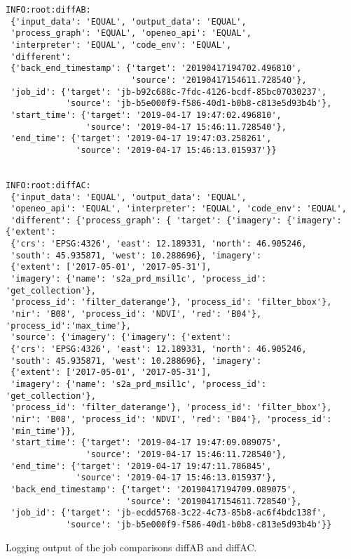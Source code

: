 \documentclass[draft,final]{vutinfth} %
\newenvironment{code}{\captionsetup{type=listing}}{}
\begin{document}
\begin{code}
	\begin{verbatim}
INFO:root:diffAB:
 {'input_data': 'EQUAL', 'output_data': 'EQUAL', 
 'process_graph': 'EQUAL', 'openeo_api': 'EQUAL', 
 'interpreter': 'EQUAL', 'code_env': 'EQUAL',
 'different': 
 {'back_end_timestamp': {'target': '20190417194702.496810',
                         'source': '20190417154611.728540'}, 
 'job_id': {'target': 'jb-b92c688c-7fdc-4126-bcdf-85bc07030237',
            'source': 'jb-b5e000f9-f586-40d1-b0b8-c813e5d93b4b'}, 
 'start_time': {'target': '2019-04-17 19:47:02.496810',
                'source': '2019-04-17 15:46:11.728540'}, 
 'end_time': {'target': '2019-04-17 19:47:03.258261',
              'source': '2019-04-17 15:46:13.015937'}} 


INFO:root:diffAC:
 {'input_data': 'EQUAL', 'output_data': 'EQUAL', 
 'openeo_api': 'EQUAL', 'interpreter': 'EQUAL', 'code_env': 'EQUAL',
 'different': {'process_graph': { 'target': {'imagery': {'imagery': {'extent': 
 {'crs': 'EPSG:4326', 'east': 12.189331, 'north': 46.905246, 
 'south': 45.935871, 'west': 10.288696}, 'imagery': 
 {'extent': ['2017-05-01', '2017-05-31'], 
 'imagery': {'name': 's2a_prd_msil1c', 'process_id': 'get_collection'}, 
 'process_id': 'filter_daterange'}, 'process_id': 'filter_bbox'}, 
 'nir': 'B08', 'process_id': 'NDVI', 'red': 'B04'}, 'process_id':'max_time'}, 
 'source': {'imagery': {'imagery': {'extent': 
 {'crs': 'EPSG:4326', 'east': 12.189331, 'north': 46.905246, 
 'south': 45.935871, 'west': 10.288696}, 'imagery': 
 {'extent': ['2017-05-01', '2017-05-31'], 
 'imagery': {'name': 's2a_prd_msil1c', 'process_id': 'get_collection'}, 
 'process_id': 'filter_daterange'}, 'process_id': 'filter_bbox'}, 
 'nir': 'B08', 'process_id': 'NDVI', 'red': 'B04'}, 'process_id': 
 'min_time'}}, 
 'start_time': {'target': '2019-04-17 19:47:09.089075',
                'source': '2019-04-17 15:46:11.728540'}, 
 'end_time': {'target': '2019-04-17 19:47:11.786845',
              'source': '2019-04-17 15:46:13.015937'}, 
 'back_end_timestamp': {'target': '20190417194709.089075',
                        'source': '20190417154611.728540'}, 
 'job_id': {'target': 'jb-ecdd5768-3c22-4c73-85b8-ac6f4bdc138f',
            'source': 'jb-b5e000f9-f586-40d1-b0b8-c813e5d93b4b'}}
	\end{verbatim}
	\caption{Logging output of the job comparisons diffAB and diffAC.}
	\label{lst:use_case3_logfile}
\end{code}
\newpage
\end{document}
